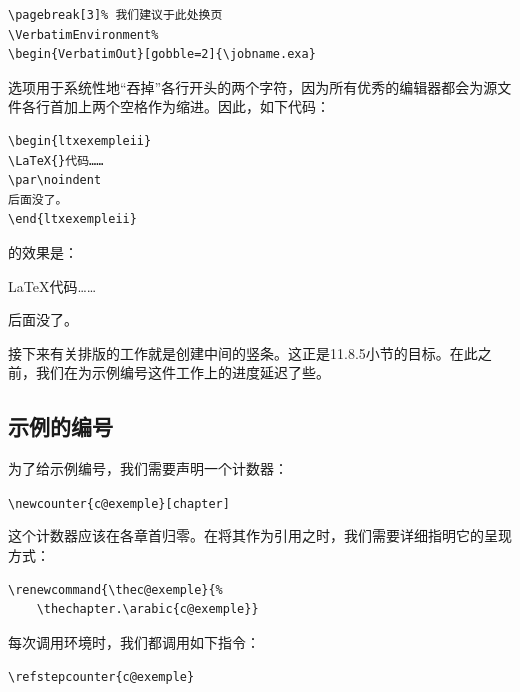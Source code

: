 \begin{dmd}
\begin{verbatim}
\pagebreak[3]% 我们建议于此处换页
\VerbatimEnvironment% 
\begin{VerbatimOut}[gobble=2]{\jobname.exa}
\end{verbatim}
\end{dmd}

选项\dm{[gobble=2]}用于系统性地“吞掉”各行开头的两个字符，因为所有优秀的编辑器都会为源文件各行首加上两个空格作为缩进。因此，如下代码：

\begin{dmd}
\begin{verbatim}
\begin{ltxexempleii}
\LaTeX{}代码……
\par\noindent
后面没了。
\end{ltxexempleii}
\end{verbatim}
\end{dmd}

的效果是：

\begin{ltxexempleii}
\LaTeX{}代码……
\par\noindent
后面没了。
\end{ltxexempleii}

接下来有关排版的工作就是创建中间的竖条。这正是11.8.5小节的目标。在此之前，我们在为示例编号这件工作上的进度延迟了些。

\subsection{示例的编号}

为了给示例编号，我们需要声明一个计数器：

\begin{dmd}
\verb|\newcounter{c@exemple}[chapter]|
\end{dmd}

这个计数器应该在各章首归零。在将其作为引用之时，我们需要详细指明它的呈现方式：

\begin{dmd}
\begin{verbatim}
\renewcommand{\thec@exemple}{% 
    \thechapter.\arabic{c@exemple}}
\end{verbatim}
\end{dmd}

每次调用环境时，我们都调用如下指令：

\begin{dmd}
\verb|\refstepcounter{c@exemple}|
\end{dmd}

